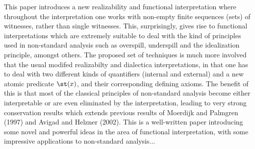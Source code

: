 This paper introduces a new realizability and functional interpretation where throughout the
interpretation one works with non-empty finite sequences (sets) of witnesses, rather than single
witnesses. This, surprisingly, gives rise to functional interpretations which are extremely suitable
to deal with the kind of principles used in non-standard analysis such as overspill, underspill
and the idealization principle, amongst others. The proposed set of techniques is much more
involved that the usual modifed realizabilty and dialectica interpretations, in that one has to
deal with two different kinds of quantifiers (internal and external) and a new atomic predicate
$\st(x)$, and their corresponding defining axioms. The benefit of this is that most of the
classical principles of non-standard analysis become either interpretable or are even eliminated by
the interpretation, leading to very strong conservation results which extends previous results of
Moerdijk and Palmgren (1997) and Avigad and Helzner (2002). This is a well-written paper
introducing some novel and powerful ideas in the area of functional interpretation,
with some impressive applications to non-standard analysis...
